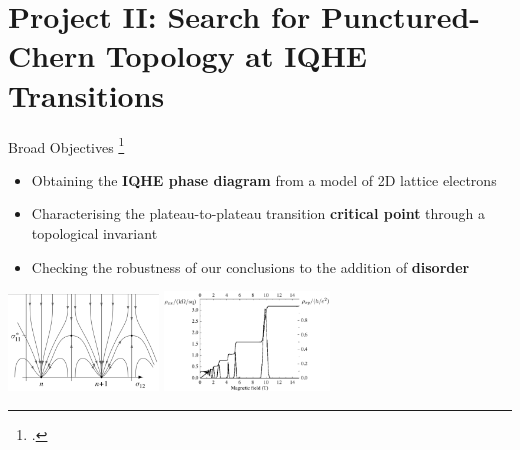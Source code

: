 \documentclass[11pt,aspectratio=169]{beamer}
\newcommand\focus[1]{%
	{\alert{\textbf{#1}}}
}
\begin{document}
\section{Project II: Search for Punctured-Chern Topology at IQHE Transitions}

\begin{frame}{Broad Objectives}
\footcite{Khmelnitskii1983,Altland_Simons_2010,prangeGirvin1987}

\begin{itemize}
	\item Obtaining the \focus{IQHE phase diagram} from a model of 2D lattice electrons\\[10pt]
	\item Characterising the plateau-to-plateau transition \focus{critical point} through a topological invariant\\[10pt]
	\item Checking the robustness of our conclusions to the addition of \focus{disorder}
\end{itemize}
\vspace{\fill}

\hspace*{\fill}
\includegraphics[width=0.3\textwidth]{iqheRG.png}
\hspace*{\fill}
\includegraphics[width=0.33\textwidth]{iqheResis.png}
\hspace*{\fill}

\end{frame}
\end{document}
